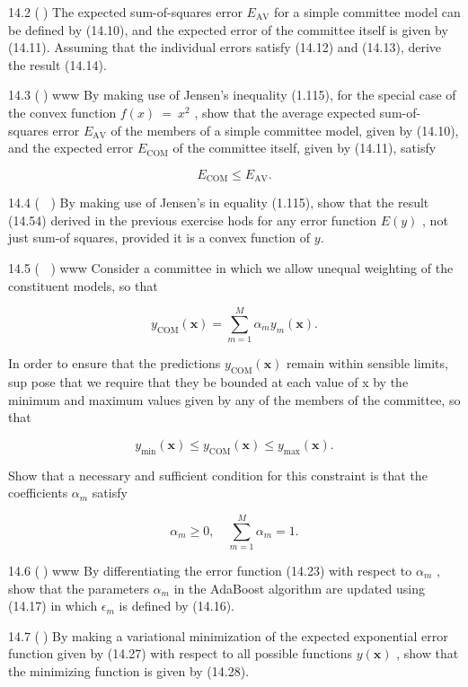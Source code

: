 \documentclass[
  10
]{article}
\begin{document}
14.2 () The expected sum-of-squares error \(E _ { \mathrm { A V } }\)
for a simple committee model can be defined by (14.10), and the expected
error of the committee itself is given by (14.11). Assuming that the
individual errors satisfy (14.12) and (14.13), derive the result
(14.14).

14.3 () www By making use of Jensen's inequality (1.115), for the
special case of the convex function \(f ( x ) ~ = ~ x ^ { 2 }\) , show
that the average expected sum-of-squares error
\(E _ { \mathrm { A V } }\) of the members of a simple committee model,
given by (14.10), and the expected error \(E _ { \mathrm { C O M } }\)
of the committee itself, given by (14.11), satisfy

\[
E _ {\mathrm{COM}} \leqslant E _ {\mathrm{AV}}.\tag{14.54}
\]

14.4 ( ) By making use of Jensen's in equality (1.115), show that the
result (14.54) derived in the previous exercise hods for any error
function \(E ( y )\) , not just sum-of squares, provided it is a convex
function of \(y .\)

14.5 ( ) www Consider a committee in which we allow unequal weighting of
the constituent models, so that

\[
y _ {\mathrm{COM}} (\mathbf {x}) = \sum_ {m = 1} ^ {M} \alpha_ {m} y _ {m} (\mathbf {x}).\tag{14.55}
\]

In order to ensure that the predictions
\(y _ { \mathrm { C O M } } ( \mathbf { x } )\) remain within sensible
limits, sup pose that we require that they be bounded at each value of x
by the minimum and maximum values given by any of the members of the
committee, so that

\[
y _ {\min} (\mathbf {x}) \leqslant y _ {\operatorname{COM}} (\mathbf {x}) \leqslant y _ {\max} (\mathbf {x}).\tag{14.56}
\]

Show that a necessary and sufficient condition for this constraint is
that the coefficients \(\alpha _ { m }\) satisfy

\[
\alpha_ {m} \geqslant 0, \quad \sum_ {m = 1} ^ {M} \alpha_ {m} = 1.\tag{14.57}
\]

14.6 () www By differentiating the error function (14.23) with respect
to \(\alpha _ { m }\) , show that the parameters \(\alpha _ { m }\) in
the AdaBoost algorithm are updated using (14.17) in which
\(\epsilon _ { m }\) is defined by (14.16).

14.7 () By making a variational minimization of the expected exponential
error function given by (14.27) with respect to all possible functions
\(y ( \mathbf x )\) , show that the minimizing function is given by
(14.28).
\end{document}
